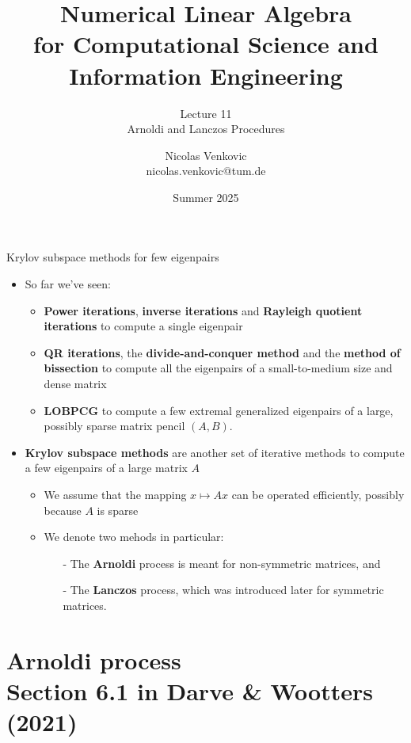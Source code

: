 \documentclass[t,usepdftitle=false]{beamer}
\title[NLA for CS and IE -- Lecture 11]{Numerical Linear Algebra\\for Computational Science and Information Engineering}
\subtitle{\vspace{.3cm}Lecture 11\\Arnoldi and Lanczos Procedures}
\date[Summer 2025]{Summer 2025}
\author[nicolas.venkovic@tum.de]{Nicolas Venkovic\\{\small nicolas.venkovic@tum.de}}
\institute[]{Group of Computational Mathematics\\School of Computation, Information and Technology\\Technical University of Munich}
\begin{document}
	
\begin{frame}
	\maketitle
\end{frame}
	
\myoutlineframe
	
\begin{frame}{Krylov subspace methods for few eigenpairs}
\begin{itemize}
\item So far we've seen:
\begin{itemize}\normalsize
\item \textbf{Power iterations}, \textbf{inverse iterations} and \textbf{Rayleigh quotient iterations} to compute a single eigenpair
\item \textbf{QR iterations}, the \textbf{divide-and-conquer method} and the \textbf{method of bissection} to compute all the eigenpairs of a small-to-medium size and dense matrix
\item \textbf{LOBPCG} to compute a few extremal generalized eigenpairs of a large, possibly sparse matrix pencil $(A,B)$.
\end{itemize}
\item \textbf{Krylov subspace methods} are another set of iterative methods to compute a few eigenpairs of a large matrix $A$
\begin{itemize}\normalsize
\item We assume that the mapping $x\mapsto Ax$ can be operated efficiently, possibly because $A$ is sparse\vspace{.1cm}
\item We denote two mehods in particular:
\begin{itemize}\normalsize
\item[-] The \textbf{Arnoldi} process is meant for non-symmetric matrices, and\vspace{.1cm}
\item[-] The \textbf{Lanczos} process, which was introduced later for symmetric matrices.
\end{itemize}
\end{itemize}
\end{itemize}
\end{frame}
		
	
\section{Arnoldi process\\{\small Section 6.1 in Darve \& Wootters (2021)}}
\end{document}
